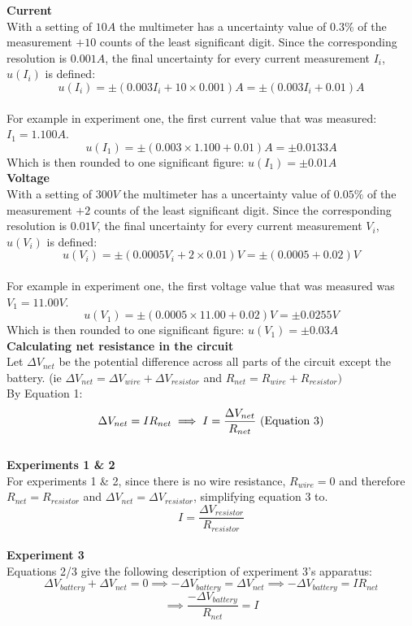\documentclass[
	letterpaper, %
	12pt, %
]{CSUniSchoolLabReport}
\begin{document}
\textbf{Current}\\
With a setting of $10A$ the multimeter has a uncertainty value of $0.3\%$ of the measurement $+10$ counts of the least significant digit. Since the corresponding resolution is $0.001A$, the final uncertainty for every current measurement $I_i$, $u(I_i)$ is defined:\\
$$u(I_i) = \pm \left(0.003 I_i +  10 \times 0.001\right)A = \pm\left(0.003I_i + 0.01\right)A$$\\
For example in experiment one, the first current value that was measured: $I_1 = 1.100A$.
$$ u(I_1) = \pm(0.003 \times 1.100 + 0.01)A = \pm 0.0133A$$
Which is then rounded to one significant figure: $u(I_1) = \pm 0.01A$\\

\textbf{Voltage}\\
With a setting of $300V$ the multimeter has a uncertainty value of $0.05\%$ of the measurement $+2$ counts of the least significant digit. Since the corresponding resolution is $0.01V$, the final uncertainty for every current measurement $V_i$, $u(V_i)$ is defined:\\
$$u(V_i) = \pm \left(0.0005 V_i +  2 \times 0.01\right)V = \pm\left(0.0005 + 0.02\right)V$$\\
For example in experiment one, the first voltage value that was measured was $V_1 = 11.00V$.
$$ u(V_1) = \pm(0.0005 \times 11.00 + 0.02)V = \pm 0.0255V$$
Which is then rounded to one significant figure: $u(V_1) = \pm 0.03A$\\

{\large\textbf{Calculating net resistance in the circuit}}\\

Let $\Delta V_{net}$ be the potential difference across all parts of the circuit except the battery. (ie $\Delta V_{net} = \Delta V_{wire} + \Delta V_{resistor}$ and $R_{net} = R_{wire}+ R_{resistor})$\\
By Equation 1:
$$ \Delta V_{net}= IR_{net} \implies I = \frac{\Delta V_{net}}{R_{net}}\  ({\rm Equation\  3})$$\\
\textbf{Experiments 1 \& 2}\\
For experiments 1 \& 2, since there is no wire resistance, $R_{wire} = 0$ and therefore $R_{net} =R_{resistor}$ and $\Delta V_{net} = \Delta V_{resistor}$, simplifying equation 3 to.\\
$$I = \frac{\Delta V_{resistor}}{R_{resistor}}$$\\

\textbf{Experiment 3}\\
Equations 2/3 give the following description of experiment 3's apparatus:
$$\Delta V_{battery} + \Delta V_{net} = 0 \implies -\Delta V_{battery} = \Delta V_{net} \implies -\Delta V_{battery} = IR_{net} $$
$$\implies \frac{-\Delta V_{battery}}{R_{net}} = I$$
\end{document}
